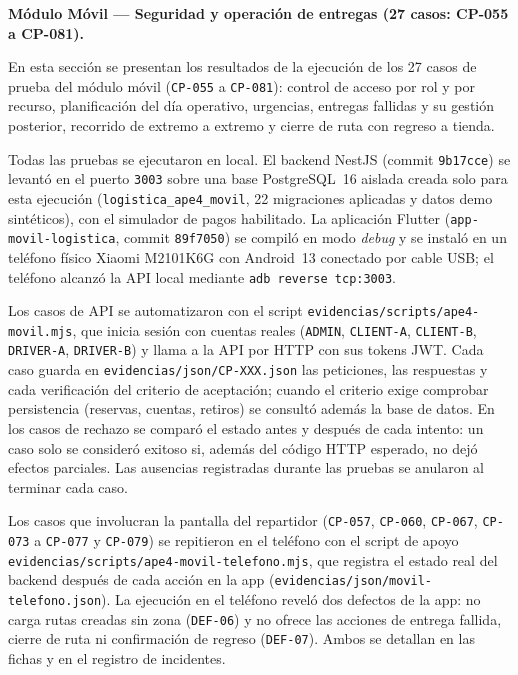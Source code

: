 \par\medskip\noindent\textbf{Módulo Móvil --- Seguridad y operación de entregas (27 casos: CP-055 a CP-081).}\par\smallskip
En esta sección se presentan los resultados de la ejecución de los 27 casos de prueba del módulo
móvil (\texttt{CP-055} a \texttt{CP-081}): control de acceso por rol y por recurso, planificación del
día operativo, urgencias, entregas fallidas y su gestión posterior, recorrido de extremo a extremo y
cierre de ruta con regreso a tienda.

Todas las pruebas se ejecutaron en local. El backend NestJS (commit \texttt{9b17cce}) se levantó en
el puerto \texttt{3003} sobre una base PostgreSQL~16 aislada creada solo para esta ejecución
(\texttt{logistica\_ape4\_movil}, 22 migraciones aplicadas y datos demo sintéticos), con el simulador
de pagos habilitado. La aplicación Flutter (\texttt{app-movil-logistica}, commit \texttt{89f7050}) se
compiló en modo \emph{debug} y se instaló en un teléfono físico Xiaomi M2101K6G con Android~13
conectado por cable USB; el teléfono alcanzó la API local mediante \texttt{adb reverse tcp:3003}.

Los casos de API se automatizaron con el script \texttt{evidencias/scripts/ape4-movil.mjs}, que inicia
sesión con cuentas reales (\texttt{ADMIN}, \texttt{CLIENT-A}, \texttt{CLIENT-B}, \texttt{DRIVER-A},
\texttt{DRIVER-B}) y llama a la API por HTTP con sus tokens JWT. Cada caso guarda en
\texttt{evidencias/json/CP-XXX.json} las peticiones, las respuestas y cada verificación del criterio de
aceptación; cuando el criterio exige comprobar persistencia (reservas, cuentas, retiros) se consultó
además la base de datos. En los casos de rechazo se comparó el estado antes y después de cada intento:
un caso solo se consideró exitoso si, además del código HTTP esperado, no dejó efectos parciales. Las
ausencias registradas durante las pruebas se anularon al terminar cada caso.

Los casos que involucran la pantalla del repartidor (\texttt{CP-057}, \texttt{CP-060},
\texttt{CP-067}, \texttt{CP-073} a \texttt{CP-077} y \texttt{CP-079}) se repitieron en el teléfono con
el script de apoyo \texttt{evidencias/scripts/ape4-movil-telefono.mjs}, que registra el estado real
del backend después de cada acción en la app (\texttt{evidencias/json/movil-telefono.json}). La
ejecución en el teléfono reveló dos defectos de la app: no carga rutas creadas sin zona
(\texttt{DEF-06}) y no ofrece las acciones de entrega fallida, cierre de ruta ni confirmación de
regreso (\texttt{DEF-07}). Ambos se detallan en las fichas y en el registro de incidentes.

